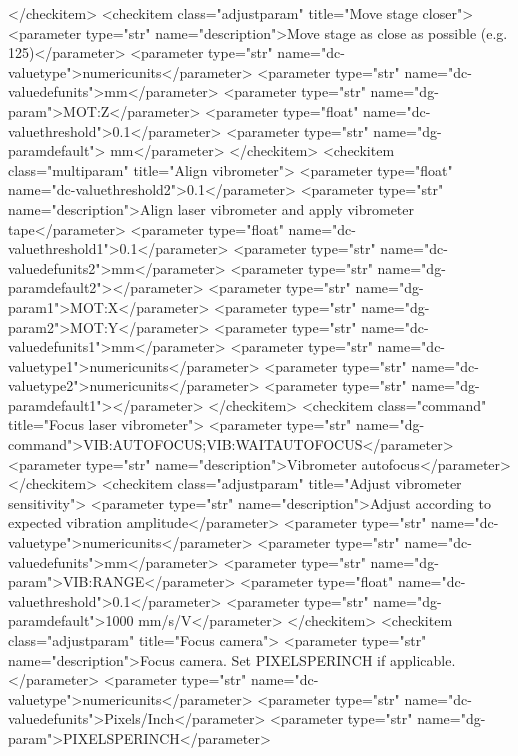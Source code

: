 \documentclass{QAstatement}
\begin{document}
{    </checkitem>
    <checkitem class="adjustparam" title="Move stage closer">
        <parameter type="str" name="description">Move stage as close as possible (e.g. 125)</parameter>
        <parameter type="str" name="dc-valuetype">numericunits</parameter>
        <parameter type="str" name="dc-valuedefunits">mm</parameter>
        <parameter type="str" name="dg-param">MOT:Z</parameter>
        <parameter type="float" name="dc-valuethreshold">0.1</parameter>
        <parameter type="str" name="dg-paramdefault"> mm</parameter>
    </checkitem>
    <checkitem class="multiparam" title="Align vibrometer">
        <parameter type="float" name="dc-valuethreshold2">0.1</parameter>
        <parameter type="str" name="description">Align laser vibrometer and
apply vibrometer tape</parameter>
        <parameter type="float" name="dc-valuethreshold1">0.1</parameter>
        <parameter type="str" name="dc-valuedefunits2">mm</parameter>
        <parameter type="str" name="dg-paramdefault2"></parameter>
        <parameter type="str" name="dg-param1">MOT:X</parameter>
        <parameter type="str" name="dg-param2">MOT:Y</parameter>
        <parameter type="str" name="dc-valuedefunits1">mm</parameter>
        <parameter type="str" name="dc-valuetype1">numericunits</parameter>
        <parameter type="str" name="dc-valuetype2">numericunits</parameter>
        <parameter type="str" name="dg-paramdefault1"></parameter>
    </checkitem>
    <checkitem class="command" title="Focus laser vibrometer">
        <parameter type="str" name="dg-command">VIB:AUTOFOCUS;VIB:WAITAUTOFOCUS</parameter>
        <parameter type="str" name="description">Vibrometer autofocus</parameter>
    </checkitem>
    <checkitem class="adjustparam" title="Adjust vibrometer sensitivity">
        <parameter type="str" name="description">Adjust according to expected vibration amplitude</parameter>
        <parameter type="str" name="dc-valuetype">numericunits</parameter>
        <parameter type="str" name="dc-valuedefunits">mm</parameter>
        <parameter type="str" name="dg-param">VIB:RANGE</parameter>
        <parameter type="float" name="dc-valuethreshold">0.1</parameter>
        <parameter type="str" name="dg-paramdefault">1000 mm/s/V</parameter>
    </checkitem>
    <checkitem class="adjustparam" title="Focus camera">
        <parameter type="str" name="description">Focus camera. Set PIXELSPERINCH if applicable.</parameter>
        <parameter type="str" name="dc-valuetype">numericunits</parameter>
        <parameter type="str" name="dc-valuedefunits">Pixels/Inch</parameter>
        <parameter type="str" name="dg-param">PIXELSPERINCH</parameter>
}
\end{document}
